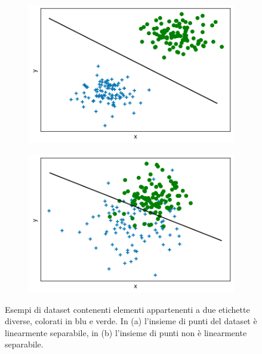 \documentclass[../../main.tex]{subfiles}
\begin{document}
    \begin{figure}[H]
        \begin{subfigure}[]{0.49\textwidth}
            \centering
            \includegraphics[width=\textwidth]{immagini/4_1/class_linearly_separable.png} 
            \caption{}
            \label{fig:linearly_sep_classification}      
        \end{subfigure}
        \begin{subfigure}[]{0.49\textwidth}
            \centering
            \includegraphics[width=\textwidth]{immagini/4_1/class_non_linearly_separable.png}    
            \caption{}
            \label{fig:non_linearly_sep_classification}    
        \end{subfigure}
        \caption{Esempi di dataset contenenti elementi appartenenti a due etichette diverse, colorati in blu e verde. In (a) l'insieme di punti del dataset è linearmente separabile, in (b) l'insieme di punti non è linearmente separabile.}
    \end{figure}
\end{document}
